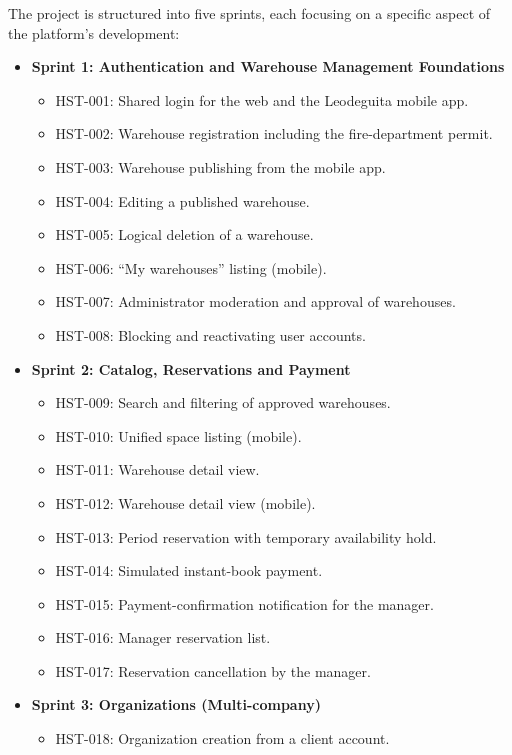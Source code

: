 \documentclass[11pt,a4paper,oneside]{report}
\begin{document}
The project is structured into five sprints, each focusing on a specific aspect of
the platform's development:

\begin{itemize}
    \item \textbf{Sprint 1: Authentication and Warehouse Management Foundations}
    \begin{itemize}
        \item HST-001: Shared login for the web and the Leodeguita mobile app.
        \item HST-002: Warehouse registration including the fire-department permit.
        \item HST-003: Warehouse publishing from the mobile app.
        \item HST-004: Editing a published warehouse.
        \item HST-005: Logical deletion of a warehouse.
        \item HST-006: ``My warehouses'' listing (mobile).
        \item HST-007: Administrator moderation and approval of warehouses.
        \item HST-008: Blocking and reactivating user accounts.
    \end{itemize}
    \item \textbf{Sprint 2: Catalog, Reservations and Payment}
    \begin{itemize}
        \item HST-009: Search and filtering of approved warehouses.
        \item HST-010: Unified space listing (mobile).
        \item HST-011: Warehouse detail view.
        \item HST-012: Warehouse detail view (mobile).
        \item HST-013: Period reservation with temporary availability hold.
        \item HST-014: Simulated instant-book payment.
        \item HST-015: Payment-confirmation notification for the manager.
        \item HST-016: Manager reservation list.
        \item HST-017: Reservation cancellation by the manager.
    \end{itemize}
    \item \textbf{Sprint 3: Organizations (Multi-company)}
    \begin{itemize}
        \item HST-018: Organization creation from a client account.

\end{itemize}
\end{itemize}
\end{document}
